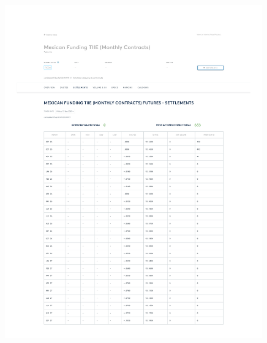\documentclass[10pt,a4paper]{article} %
\begin{document}
\begin{figure}[h]
  \centering
  \includegraphics[width=0.99\textwidth]{appendix/TIIE12SEP.pdf}
  \label{fig:tiie_settlements}
\end{figure}
\end{document}
